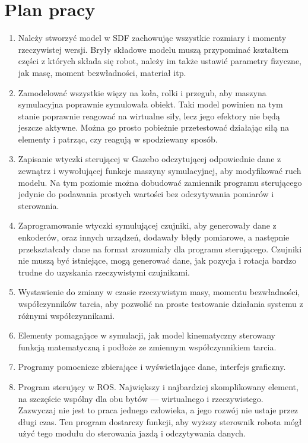 \section{Plan pracy}
	\begin{enumerate}
	\item Należy stworzyć model w SDF zachowując wszystkie rozmiary i momenty rzeczywistej wersji.
	Bryły składowe modelu muszą przypominać kształtem części z których składa się robot, należy im także ustawić parametry fizyczne, jak masę, moment bezwładności, materiał itp.

	\item Zamodelować wszystkie więzy na koła, rolki i przegub, aby maszyna symulacyjna poprawnie symulowała obiekt.
	Taki model powinien na tym stanie poprawnie reagować na wirtualne siły, lecz jego efektory nie będą jeszcze aktywne.
	Można go prosto pobieżnie przetestować działając siłą na elementy i patrząc, czy reagują w spodziewany sposób.

	\item Zapisanie wtyczki sterującej w Gazebo odczytującej odpowiednie dane z zewnątrz i wywołującej funkcje maszyny symulacyjnej, aby modyfikować ruch modelu.
	Na tym poziomie można dobudować zamiennik programu sterującego jedynie do podawania prostych wartości bez odczytywania pomiarów i sterowania.

	\item Zaprogramowanie wtyczki symulującej czujniki, aby generowały dane z enkoderów, oraz innych urządzeń, dodawały błędy pomiarowe, a następnie przekształcały dane na format zrozumiały dla programu sterującego.
	Czujniki nie muszą być istniejące, mogą generować dane, jak pozycja i rotacja bardzo trudne do uzyskania rzeczywistymi czujnikami.

	\item Wystawienie do zmiany w czasie rzeczywistym masy, momentu bezwładności, współczynników tarcia, aby pozwolić na proste testowanie działania systemu z różnymi współczynnikami.

	\item Elementy pomagające w symulacji, jak model kinematyczny sterowany funkcją matematyczną i podłoże ze zmiennym współczynnikiem tarcia.

	\item Programy pomocnicze zbierające i wyświetlające dane, interfejs graficzny.

	\item Program sterujący w ROS. Największy i najbardziej skomplikowany element, na szczęście wspólny dla obu bytów --- wirtualnego i rzeczywistego.
	Zazwyczaj nie jest to praca jednego człowieka, a jego rozwój nie ustaje przez długi czas.
	Ten program dostarczy funkcji, aby wyższy sterownik robota mógł użyć tego modułu do sterowania jazdą i odczytywania danych.
	\end{enumerate}

